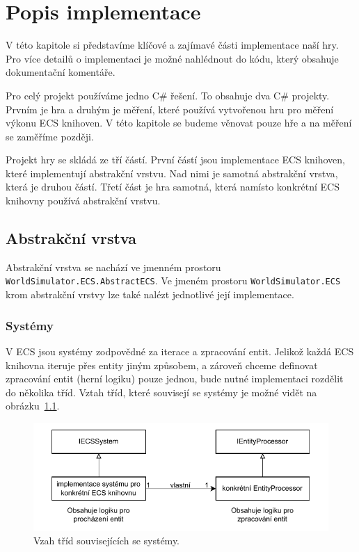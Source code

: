 \chapter{Popis implementace}
V této kapitole si představíme klíčové a zajímavé části implementace naší hry. Pro více detailů o implementaci je možné nahlédnout do kódu, který obsahuje dokumentační komentáře.

Pro celý projekt používáme jedno C\# řešení. To obsahuje dva C\# projekty. Prvním je hra a druhým je měření, které používá vytvořenou hru pro měření výkonu ECS knihoven. V této kapitole se budeme věnovat pouze hře a na měření se zaměříme později.

Projekt hry se skládá ze tří částí. První částí jsou implementace ECS knihoven, které implementují abstrakční vrstvu. Nad nimi je samotná abstrakční vrstva, která je druhou částí. Třetí část je hra samotná, která namísto konkrétní ECS knihovny používá abstrakční vrstvu.

\section{Abstrakční vrstva}
\label{sec:abstract-layer}
Abstrakční vrstva se nachází ve jmenném prostoru \texttt{WorldSimulator.ECS.AbstractECS}. Ve jmeném prostoru \texttt{WorldSimulator.ECS} krom abstrakční vrstvy lze také nalézt jednotlivé její implementace.

\subsection{Systémy}
V ECS jsou systémy zodpovědné za iterace a zpracování entit. Jelikož každá ECS knihovna iteruje přes entity jiným způsobem, a zároveň chceme definovat zpracování entit (herní logiku) pouze jednou, bude nutné implementaci rozdělit do několika tříd. Vztah tříd, které souvisejí se systémy je možné vidět na obrázku~\ref{fig:abstract-layer-systems}.

\begin{figure}[!htb]
  \centering
  \includegraphics[width=0.8\linewidth]{img/abstract-layer-systems.pdf}
  \caption{Vzah tříd souvisejících se systémy.}
  \label{fig:abstract-layer-systems}
\end{figure}

